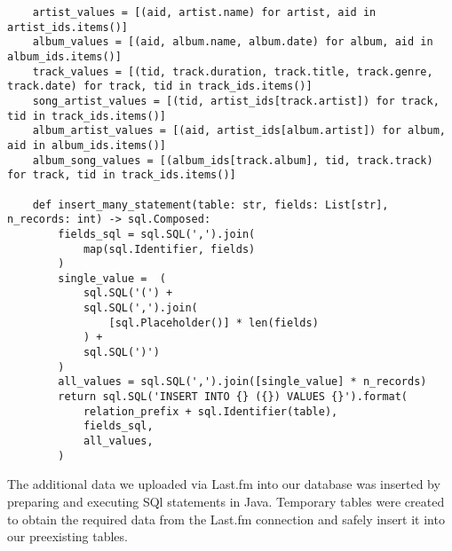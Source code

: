 \documentclass[12pt]{article}
\begin{document}
    \begin{lstlisting}
    artist_values = [(aid, artist.name) for artist, aid in artist_ids.items()]
    album_values = [(aid, album.name, album.date) for album, aid in album_ids.items()]
    track_values = [(tid, track.duration, track.title, track.genre, track.date) for track, tid in track_ids.items()]
    song_artist_values = [(tid, artist_ids[track.artist]) for track, tid in track_ids.items()]
    album_artist_values = [(aid, artist_ids[album.artist]) for album, aid in album_ids.items()]
    album_song_values = [(album_ids[track.album], tid, track.track) for track, tid in track_ids.items()]

    def insert_many_statement(table: str, fields: List[str], n_records: int) -> sql.Composed:
        fields_sql = sql.SQL(',').join(
            map(sql.Identifier, fields)
        )
        single_value =  (
            sql.SQL('(') +
            sql.SQL(',').join(
                [sql.Placeholder()] * len(fields)
            ) +
            sql.SQL(')')
        )
        all_values = sql.SQL(',').join([single_value] * n_records)
        return sql.SQL('INSERT INTO {} ({}) VALUES {}').format(
            relation_prefix + sql.Identifier(table),
            fields_sql,
            all_values,
        )
    \end{lstlisting}


    \noindent The additional data we uploaded via Last.fm into our database was inserted
    by preparing and executing SQl statements in Java. Temporary tables
    were created to obtain the required data from the Last.fm connection and safely
    insert it into our preexisting tables.
\end{document}
